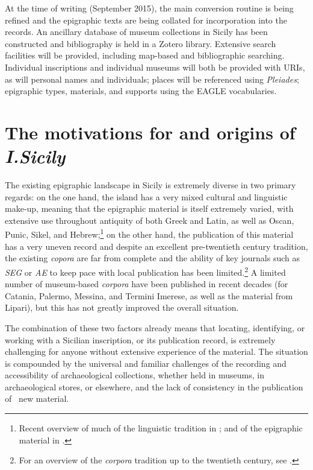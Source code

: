 \documentclass[amsthm,ebook]{saparticle}
\begin{document}
At the time of writing (September 2015), the main conversion routine is being refined and the epigraphic texts are being
collated for incorporation into the records. An ancillary database of museum collections in Sicily has been constructed
and bibliography is held in a Zotero library. Extensive search facilities will be provided, including map-based and
bibliographic searching. Individual inscriptions and individual museums will both be provided with URIs, as will
personal names and individuals; places will be referenced using \emph{Pleiades}; epigraphic types, materials, and supports
using the EAGLE vocabularies.

\section{The motivations for and origins of \emph{I.Sicily}}
\noindent The existing epigraphic landscape in Sicily is extremely diverse in two primary regards: on the one hand, the island has
a very mixed cultural and linguistic make-up, meaning that the epigraphic material is itself extremely varied, with
extensive use throughout antiquity of both Greek and Latin, as well as Oscan, Punic, Sikel, and Hebrew;\footnote{
Recent overview of much of the linguistic tradition in \citet{tribulato_language_2012}; and of the epigraphic material in \citet{gulletta_sicilia_1999}.} on the other hand, the publication of this material has a very uneven record and despite an excellent
pre-twentieth century tradition, the existing \emph{copora} are far from complete and the ability of key journals such as \emph{SEG}
or \emph{AE} to keep pace with local publication has been limited.\footnote{ For an overview of the \emph{corpora} tradition up to
the twentieth century, see \citet{de_vido_corpora_1999}.} A limited number of museum-based \emph{corpora} have been published in recent
decades (for Catania, Palermo, Messina, and Termini Imerese, as well as the material from Lipari), but this has not
greatly improved the overall situation.

The combination of these two factors already means that locating, identifying, or working with a Sicilian inscription,
or its publication record, is extremely challenging for anyone without extensive experience of the material. The
situation is compounded by the universal and familiar challenges of the recording and accessibility of archaeological
collections, whether held in museums, in archaeological stores, or elsewhere, and the lack of consistency in the
publication of \ new material.
\end{document}
